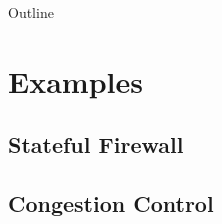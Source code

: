 \documentclass{beamer}
\begin{document}
\begin{frame}
    \titlepage
\end{frame}

\begin{frame}{Outline}
    \tableofcontents
\end{frame}

\section{Examples}

\subsection{Stateful Firewall}



\subsection{Congestion Control}


\end{document}
